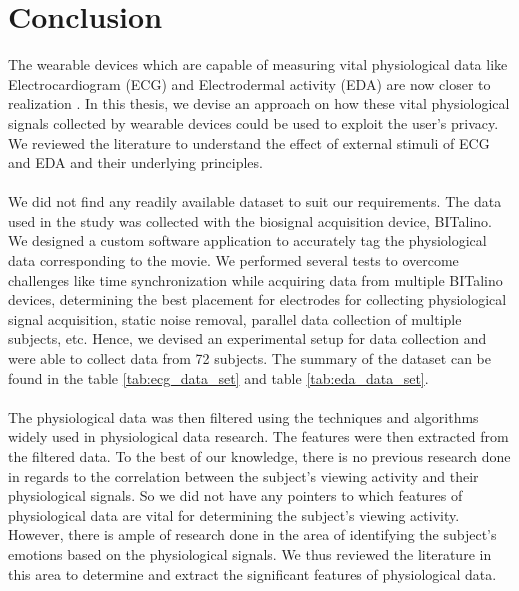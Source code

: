 
\section{Conclusion}
The wearable devices which are capable of measuring vital physiological data like Electrocardiogram (ECG) and Electrodermal activity (EDA) are now closer to realization \cite{haghi_wearable_2017}. In this thesis, we devise an approach on how these vital physiological signals collected by wearable devices could be used to exploit the user's privacy. We reviewed the literature to understand the effect of external stimuli of ECG and EDA and their underlying principles.

\paragraph{} We did not find any readily available dataset to suit our requirements. The data used in the study was collected with the biosignal acquisition device, BITalino. We designed a custom software application to accurately tag the physiological data corresponding to the movie. We performed several tests to overcome challenges like time synchronization while acquiring data from multiple BITalino devices, determining the best placement for electrodes for collecting physiological signal acquisition, static noise removal, parallel data collection of multiple subjects, etc. Hence, we devised an experimental setup for data collection and were able to collect data from 72 subjects. The summary of the dataset can be found in the table \ref{tab:ecg_data_set} and table \ref{tab:eda_data_set}.

\paragraph{} The physiological data was then filtered using the techniques and algorithms widely used in physiological data research. The features were then extracted from the filtered data. To the best of our knowledge, there is no previous research done in regards to the correlation between the subject's viewing activity and their physiological signals. So we did not have any pointers to which features of physiological data are vital for determining the subject's viewing activity. However, there is ample of research done in the area of identifying the subject's emotions based on the physiological signals. We thus reviewed the literature in this area to determine and extract the significant features of physiological data.

